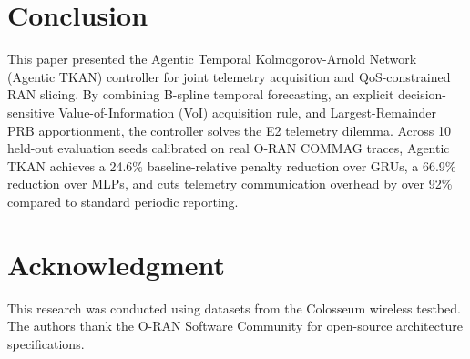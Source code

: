 \documentclass[conference]{IEEEtran}
\begin{document}
\section{Conclusion}
This paper presented the Agentic Temporal Kolmogorov-Arnold Network (Agentic TKAN) controller for joint telemetry acquisition and QoS-constrained RAN slicing. By combining B-spline temporal forecasting, an explicit decision-sensitive Value-of-Information (VoI) acquisition rule, and Largest-Remainder PRB apportionment, the controller solves the E2 telemetry dilemma. Across 10 held-out evaluation seeds calibrated on real O-RAN COMMAG traces, Agentic TKAN achieves a 24.6\% baseline-relative penalty reduction over GRUs, a 66.9\% reduction over MLPs, and cuts telemetry communication overhead by over 92\% compared to standard periodic reporting.

\section*{Acknowledgment}
This research was conducted using datasets from the Colosseum wireless testbed. The authors thank the O-RAN Software Community for open-source architecture specifications.

\balance


\end{document}
